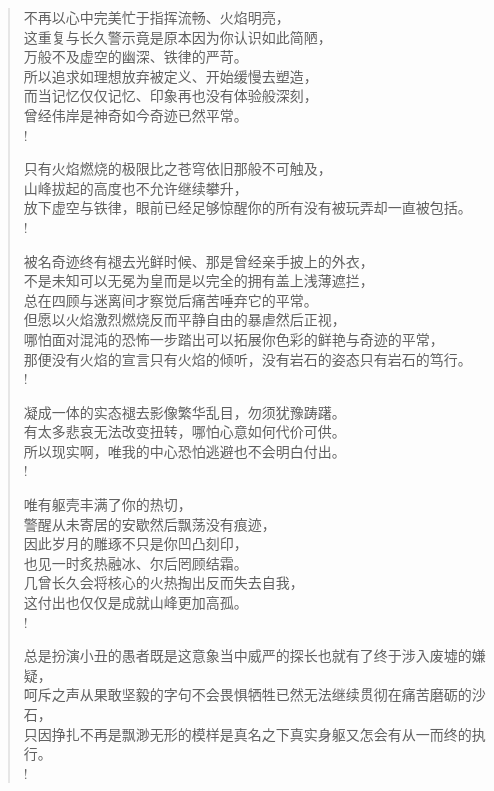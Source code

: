 \documentclass[UTF8, 12pt, a4paper]{ctexrep} %
\begin{document}
\begin{verse}
不再以心中完美忙于指挥流畅、火焰明亮，\\
这重复与长久警示竟是原本因为你认识如此简陋，\\
万般不及虚空的幽深、铁律的严苛。\\
所以追求如理想放弃被定义、开始缓慢去塑造，\\
而当记忆仅仅记忆、印象再也没有体验般深刻，\\
曾经伟岸是神奇如今奇迹已然平常。\\!

只有火焰燃烧的极限比之苍穹依旧那般不可触及，\\
山峰拔起的高度也不允许继续攀升，\\
放下虚空与铁律，眼前已经足够惊醒你的所有没有被玩弄却一直被包括。\\!

被名奇迹终有褪去光鲜时候、那是曾经亲手披上的外衣，\\
不是未知可以无冕为皇而是以完全的拥有盖上浅薄遮拦，\\
总在四顾与迷离间才察觉后痛苦唾弃它的平常。\\
但愿以火焰激烈燃烧反而平静自由的暴虐然后正视，\\
哪怕面对混沌的恐怖一步踏出可以拓展你色彩的鲜艳与奇迹的平常，\\
那便没有火焰的宣言只有火焰的倾听，没有岩石的姿态只有岩石的笃行。\\!

凝成一体的实态褪去影像繁华乱目，勿须犹豫踌躇。\\
有太多悲哀无法改变扭转，哪怕心意如何代价可供。\\
所以现实啊，唯我的中心恐怕逃避也不会明白付出。\\!

唯有躯壳丰满了你的热切，\\
警醒从未寄居的安歇然后飘荡没有痕迹，\\
因此岁月的雕琢不只是你凹凸刻印，\\
也见一时炙热融冰、尔后罔顾结霜。\\
几曾长久会将核心的火热掏出反而失去自我，\\
这付出也仅仅是成就山峰更加高孤。\\!

总是扮演小丑的愚者既是这意象当中威严的探长也就有了终于涉入废墟的嫌疑，\\
呵斥之声从果敢坚毅的字句不会畏惧牺牲已然无法继续贯彻在痛苦磨砺的沙石，\\
只因挣扎不再是飘渺无形的模样是真名之下真实身躯又怎会有从一而终的执行。\\!


\end{verse}
\end{document}
